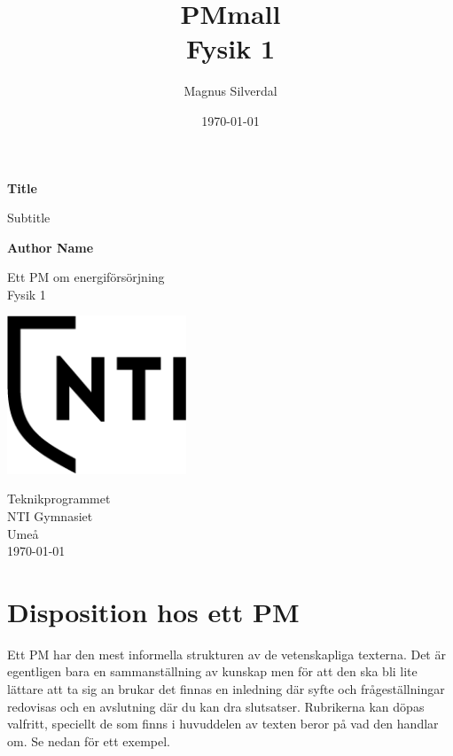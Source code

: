 \documentclass[11p]{article}
\title{PMmall \\ \small Fysik 1}
\author{Magnus Silverdal }
\date{\today}
\begin{document}
    \begin{titlepage}
        \begin{center}
            \vspace*{1cm}

            \Huge
            \textbf{Title}

            \vspace{0.5cm}
            \LARGE
            Subtitle

            \vspace{1.5cm}

            \textbf{Author Name}

            \vfill

            Ett PM om energiförsörjning \\
            Fysik 1

            \vspace{0.8cm}

            \includegraphics[width=0.4\textwidth]{../images/NTI Gymnasiet_Symbol_print_svart.png}

            \Large
            Teknikprogrammet\\
            NTI Gymnasiet\\
            Umeå\\
            \today

        \end{center}
    \end{titlepage}
    \tableofcontents
    \newpage
    \section{Disposition hos ett PM}
    Ett PM har den mest informella strukturen av de vetenskapliga texterna. Det är egentligen bara en sammanställning av kunskap men för att den ska bli lite lättare att ta sig an brukar det finnas en inledning där syfte och frågeställningar redovisas och en avslutning där du kan dra slutsatser. Rubrikerna kan döpas valfritt, speciellt de som finns i huvuddelen av texten beror på vad den handlar om. Se nedan för ett exempel.
\end{document}
